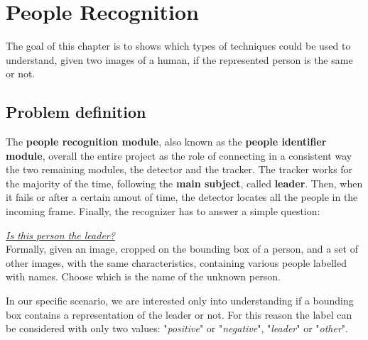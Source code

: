 	\chapter{People Recognition} \label{cha:recognition}
The goal of this chapter is to shows which types of techniques could be used to understand, given two images of a human, if the represented person is the same or not.

\section{Problem definition}
The \textbf{people recognition module}, also known as the \textbf{people identifier module}, overall the entire project as the role of connecting in a consistent way the two remaining modules, the detector and the tracker. The tracker works for the majority of the time, following the \textbf{main subject}, called \textbf{leader}. Then, when it fails or after a certain amout of time, the detector locates all the people in the incoming frame. Finally, the recognizer has to answer a simple question:
\begin{tcolorbox}
	\begin{center}
		\underline{\textit{Is this person the leader?}}\\
		Formally, given an image, cropped on the bounding box of a person, and a set of other images, with the same characteristics, containing various people labelled with names. Choose which is the name of the unknown person.
	\end{center}
\end{tcolorbox}
In our specific scenario, we are interested only into understanding if a bounding box contains a representation of the leader or not. For this reason the label can be considered with only two values: "\textit{positive}" or "\textit{negative}", "\textit{leader}" or "\textit{other}".\\

